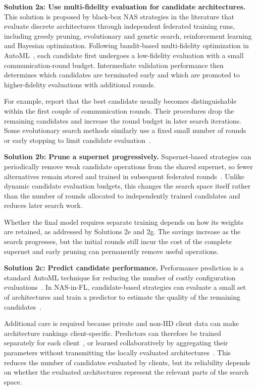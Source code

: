 \noindent\textbf{Solution 2a: Use multi-fidelity evaluation for candidate architectures.} This solution is proposed by black-box NAS strategies in the literature that evaluate discrete architectures through independent federated training runs, including greedy pruning, evolutionary and genetic search, reinforcement learning and Bayesian optimization. Following bandit-based multi-fidelity optimization in AutoML~\cite{automl_book_hpo_2019}, each candidate first undergoes a low-fidelity evaluation with a small communication-round budget. Intermediate validation performance then determines which candidates are terminated early and which are promoted to higher-fidelity evaluations with additional rounds.

For example, \cite{decnas_2022,fednas_over_hetero_mobile_devices_2022} report that the best candidate usually becomes distinguishable within the first couple of communication rounds. Their procedures drop the remaining candidates and increase the round budget in later search iterations. Some evolutionary search methods similarly use a fixed small number of rounds or early stopping to limit candidate evaluation~\cite{multi_objective_evo_fl_2020,gpt4-boosted_pso_fednas_2024}.

\noindent\textbf{Solution 2b: Prune a supernet progressively.} Supernet-based strategies can periodically remove weak candidate operations from the shared supernet, so fewer alternatives remain stored and trained in subsequent federated rounds~\cite{dfnas_2020,peaches_2024}. Unlike dynamic candidate evaluation budgets, this changes the search space itself rather than the number of rounds allocated to independently trained candidates  and reduces later search work. 

Whether the final model requires separate training depends on how its weights are retained, as addressed by Solutions 2e and 2g. The savings increase as the search progresses, but the initial rounds still incur the cost of the complete supernet and early pruning can permanently remove useful operations.

\noindent\textbf{Solution 2c: Predict candidate performance.} Performance prediction is a standard AutoML technique for reducing the number of costly configuration evaluations~\cite{automl_book_hpo_2019}. In NAS-in-FL, candidate-based strategies can evaluate a small set of architectures and train a predictor to estimate the quality of the remaining candidates~\cite{hapfnas_2025,energy_fednas_2025}. 

Additional care is required because private and non-IID client data can make architecture rankings client-specific. Predictors can therefore be trained separately for each client~\cite{hapfnas_2025}, or learned collaboratively by aggregating their parameters without transmitting the locally evaluated architectures~\cite{federated_bayesian_optimization_nas_2023}. This reduces the number of candidates evaluated by clients, but its reliability depends on whether the evaluated architectures represent the relevant parts of the search space.

